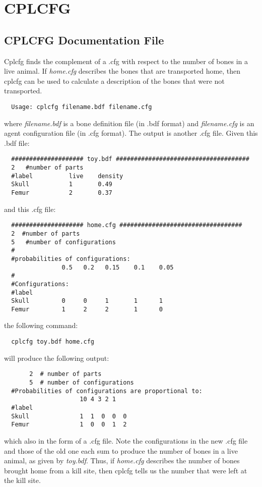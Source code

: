 
\section{CPLCFG}%

\subsection*{CPLCFG Documentation File}%

Cplcfg finds the complement of a .cfg with respect to the number of
bones in a live animal.  If {\em home.cfg\/} describes the bones that are
transported home, then cplcfg can be used to calculate a description
of the bones that were not transported.
\begin{verbatim}
  Usage: cplcfg filename.bdf filename.cfg
\end{verbatim}

where {\em filename.bdf\/} is a bone definition file (in .bdf format) and
{\em filename.cfg\/} is an agent configuration file (in .cfg format).  The
output is another .cfg file.  Given this .bdf file:
\begin{verbatim}
  #################### toy.bdf #####################################
  2   #number of parts
  #label          live    density
  Skull           1       0.49
  Femur           2       0.37
\end{verbatim}

and this .cfg file:
\begin{verbatim}
  #################### home.cfg ##################################
  2  #number of parts
  5   #number of configurations
  #
  #probabilities of configurations:
                0.5   0.2   0.15    0.1    0.05
  #
  #Configurations:
  #label 
  Skull         0     0     1       1      1
  Femur         1     2     2       1      0
\end{verbatim}

the following command:
\begin{verbatim}
  cplcfg toy.bdf home.cfg
\end{verbatim}

will produce the following output:
\begin{verbatim}
       2  # number of parts
       5  # number of configurations
  #Probabilities of configurations are proportional to:
                     10 4 3 2 1
  #label
  Skull              1  1  0  0  0
  Femur              1  0  0  1  2
\end{verbatim}

which also in the form of a .cfg file.  Note the configurations in the
new .cfg file and those of the old one each sum to produce the number
of bones in a live animal, as given by {\em toy.bdf\/}.  Thus, if
{\em home.cfg\/} describes the number of bones brought home from a kill
site, then cplcfg tells us the number that were left at the kill site.
